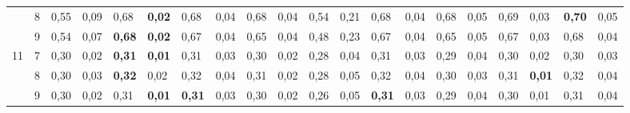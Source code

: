 \documentclass[conference]{IEEEtran}
\begin{document}
\begin{table}[]
\begin{tabular}{|cl|ll|ll|ll|ll|ll|ll|ll|ll|ll|}
		\multicolumn{1}{|c|}{}                    & 8 & \multicolumn{1}{l|}{0,55}          & 0,09          & \multicolumn{1}{l|}{0,68}          & \textbf{0,02} & \multicolumn{1}{l|}{0,68}          & 0,04          & \multicolumn{1}{l|}{0,68} & 0,04          & \multicolumn{1}{l|}{0,54}                 & 0,21          & \multicolumn{1}{l|}{0,68}          & 0,04          & \multicolumn{1}{l|}{0,68}          & 0,05          & \multicolumn{1}{l|}{0,69}          & 0,03          & \multicolumn{1}{l|}{\textbf{0,70}} & 0,05          \\ \cline{2-20} 
		\multicolumn{1}{|c|}{}                    & 9 & \multicolumn{1}{l|}{0,54}          & 0,07          & \multicolumn{1}{l|}{\textbf{0,68}} & \textbf{0,02} & \multicolumn{1}{l|}{0,67}          & 0,04          & \multicolumn{1}{l|}{0,65} & 0,04          & \multicolumn{1}{l|}{0,48}                 & 0,23          & \multicolumn{1}{l|}{0,67}          & 0,04          & \multicolumn{1}{l|}{0,65}          & 0,05          & \multicolumn{1}{l|}{0,67}          & 0,03          & \multicolumn{1}{l|}{0,68}          & 0,04          \\ \hline
		\multicolumn{1}{|c|}{\multirow{3}{*}{11}} & 7 & \multicolumn{1}{l|}{0,30}          & 0,02          & \multicolumn{1}{l|}{\textbf{0,31}} & \textbf{0,01} & \multicolumn{1}{l|}{0,31}          & 0,03          & \multicolumn{1}{l|}{0,30} & 0,02          & \multicolumn{1}{l|}{0,28}                 & 0,04          & \multicolumn{1}{l|}{0,31}          & 0,03          & \multicolumn{1}{l|}{0,29}          & 0,04          & \multicolumn{1}{l|}{0,30}          & 0,02          & \multicolumn{1}{l|}{0,30}          & 0,03          \\ \cline{2-20} 
		\multicolumn{1}{|c|}{}                    & 8 & \multicolumn{1}{l|}{0,30}          & 0,03          & \multicolumn{1}{l|}{\textbf{0,32}} & 0,02          & \multicolumn{1}{l|}{0,32}          & 0,04          & \multicolumn{1}{l|}{0,31} & 0,02          & \multicolumn{1}{l|}{0,28}                 & 0,05          & \multicolumn{1}{l|}{0,32}          & 0,04          & \multicolumn{1}{l|}{0,30}          & 0,03          & \multicolumn{1}{l|}{0,31}          & \textbf{0,01} & \multicolumn{1}{l|}{0,32}          & 0,04          \\ \cline{2-20} 
		\multicolumn{1}{|c|}{}                    & 9 & \multicolumn{1}{l|}{0,30}          & 0,02          & \multicolumn{1}{l|}{0,31}          & \textbf{0,01} & \multicolumn{1}{l|}{\textbf{0,31}} & 0,03          & \multicolumn{1}{l|}{0,30} & 0,02          & \multicolumn{1}{l|}{0,26}                 & 0,05          & \multicolumn{1}{l|}{\textbf{0,31}} & 0,03          & \multicolumn{1}{l|}{0,29}          & 0,04          & \multicolumn{1}{l|}{0,30}          & 0,01          & \multicolumn{1}{l|}{0,31}          & 0,04          \\ \hline

\end{tabular}
\end{table}
\end{document}
